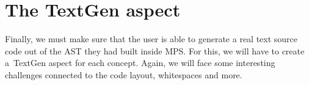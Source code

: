 \section{The TextGen aspect}
Finally, we must make sure that the user is able to generate a real text source code out of the AST they had built inside MPS. For this, we will have to create a~TextGen aspect for each concept. Again, we will face some interesting challenges connected to the code layout, whitespaces and more.
